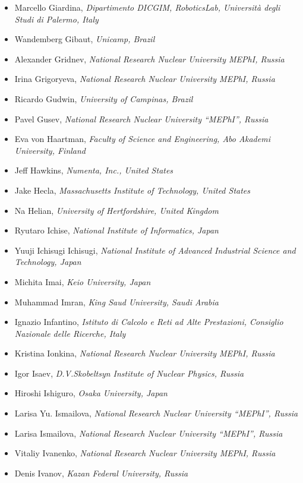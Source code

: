 \documentclass[10pt,fleqn,openany]{book} %
\begin{document}
\begin{itemize}
		\item Marcello Giardina, \textit{Dipartimento DICGIM, RoboticsLab, Università degli Studi di Palermo, Italy}
		\item Wandemberg Gibaut, \textit{Unicamp, Brazil}
		\item Alexander Gridnev, \textit{National Research Nuclear University MEPhI, Russia}
		\item Irina Grigoryeva, \textit{National Research Nuclear University MEPhI, Russia}
		\item Ricardo Gudwin, \textit{University of Campinas, Brazil}
		\item Pavel Gusev, \textit{National Research Nuclear University ``MEPhI'', Russia}
		\item Eva von Haartman, \textit{Faculty of Science and Engineering, Abo Akademi University, Finland}
		\item Jeff Hawkins, \textit{Numenta, Inc., United States}
		\item Jake Hecla, \textit{Massachusetts Institute of Technology, United States}
		\item Na Helian, \textit{University of Hertfordshire, United Kingdom}
		\item Ryutaro Ichise, \textit{National Institute of Informatics, Japan}
		\item Yuuji Ichisugi Ichisugi, \textit{National Institute of Advanced Industrial Science and Technology, Japan}
		\item Michita Imai, \textit{Keio University, Japan}
		\item Muhammad Imran, \textit{King Saud University, Saudi Arabia}
		\item Ignazio Infantino, \textit{Istituto di Calcolo e Reti ad Alte Prestazioni, Consiglio Nazionale delle Ricerche, Italy}
		\item Kristina Ionkina, \textit{National Research Nuclear University MEPhI, Russia}
		\item Igor Isaev, \textit{D.V.Skobeltsyn Institute of Nuclear Physics, Russia}
		\item Hiroshi Ishiguro, \textit{Osaka University, Japan}
		\item Larisa Yu. Ismailova, \textit{National Research Nuclear University ``MEPhI'', Russia}
		\item Larisa Ismailova, \textit{National Research Nuclear University ``MEPhI'', Russia}
		\item Vitaliy Ivanenko, \textit{National Research Nuclear University MEPhI, Russia}
		\item Denis Ivanov, \textit{Kazan Federal University, Russia}

\end{itemize}
\end{document}
